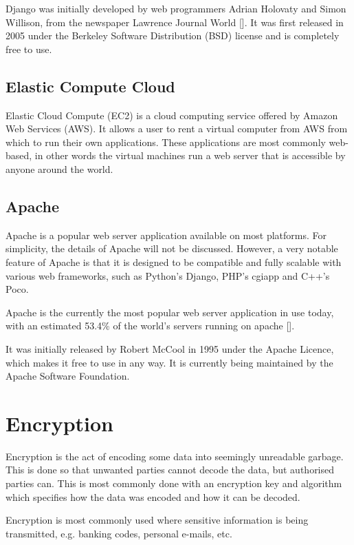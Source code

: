 Django was initially developed by web programmers Adrian Holovaty and Simon Willison, from the
newspaper Lawrence Journal World [\cite{website:django-exist}]. It was first released in 2005
under the Berkeley Software Distribution (BSD) license and is completely free to use.

\subsection{Elastic Compute Cloud}
\label{sec:ec2}

Elastic Cloud Compute (EC2) is a cloud computing service offered by Amazon Web Services (AWS).
It allows a user to rent a virtual computer from AWS from which to run their own applications.
These applications are most commonly web-based, in other words the virtual machines run a
web server that is accessible by anyone around the world.  

\subsection{Apache}
\label{sec:apache}

Apache is a popular web server application available on most platforms. For simplicity, the
details of Apache will not be discussed. However, a very notable feature of Apache is that it
is designed to be compatible and fully scalable with various web frameworks, such as Python's
Django, PHP's cgiapp and C++'s Poco.

Apache is the currently the most popular web server application in use today, with an estimated
53.4\% of the world's servers running on apache [\cite{website:apache-usage}].

It was initially released by Robert McCool in 1995 under the Apache Licence, which makes it
free to use in any way. It is currently being maintained by the Apache Software Foundation. 

\section{Encryption}

Encryption is the act of encoding some data into seemingly unreadable garbage. This is done so
that unwanted parties cannot decode the data, but authorised parties can. This is most commonly
done with an encryption key and algorithm which specifies how the data was encoded and how it
can be decoded.

Encryption is most commonly used where sensitive information is being transmitted, e.g. banking
codes, personal e-mails, etc.


